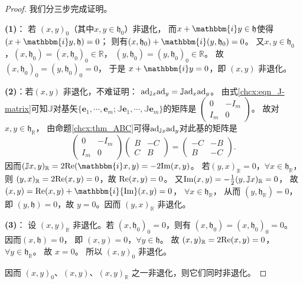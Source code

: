 \begin{proof}
我们分三步完成证明。

{\bfseries (1)}： 若 $(x, y)_0$（其中$x,y\in\mathfrak{h}_0$）非退化，
而$x+\mathbbm{i} y \in \mathfrak{h}$使得$(x+\mathbbm{i} y, \mathfrak{h})=0$；
则有$(x, \mathfrak{h}_0)+\mathbbm{i} (y, \mathfrak{h}_0)=0$。
又$x, y \in \mathfrak{h}_0$，$(x, \mathfrak{h}_0)= (x, \mathfrak{h}_0)_0 \in \mathbb{R}$，
$(y, \mathfrak{h}_0)=(y, \mathfrak{h}_0)_0 \in \mathbb{R}$。 
故$(x, \mathfrak{h}_0)_0=(y, \mathfrak{h}_0)_0=0$，
于是 $x+\mathbbm{i} y=0$，即 $(x, y)$ 非退化。

{\bfseries (2)}：若$(x, y)$ 非退化，不难证明：
${\rm ad}_{ \mathbb{J} x} {\rm ad}_y=\mathbb{J} {\rm ad}_x {\rm ad}_y$。
由式\eqref{chcx:eqn_J-matrix}可知$\mathbb{J}$对基矢$\{\boldsymbol{e}_1,\cdots,\boldsymbol{e}_m;
\mathbb{J}\boldsymbol{e}_1,\cdots,\mathbb{J}\boldsymbol{e}_m\}$的矩阵是
$    \left(\begin{smallmatrix}
    0& -I_m \\ I_m & 0
\end{smallmatrix}\right)$。
故对 $x, y \in \mathfrak{h}_{\mathbb{R}}$，
由命题\ref{chcx:thm_ABC}可得${\rm ad}_{ \mathbb{J} x} {\rm ad}_y$对此基的矩阵是
\begin{equation}
\left(\begin{array}{cc}
    0 & -I_m \\
    I_m & 0
\end{array}\right)\left(\begin{array}{cc}
    B & -C \\
    C & B
\end{array}\right)=\left(\begin{array}{cc}
    -C & -B \\
    B & -C
\end{array}\right) .
\end{equation}
因而$(\mathbb{J} x, y)_{\mathbb{R}}=2 {\rm Re}(\mathbbm{i} x, y)=-2 {\rm Im}(x, y)$。
若$(y, x)_{\mathbb{R}}=0$，$\forall x \in \mathfrak{h}_{\mathbb{R}}$，
则 $(y, x)_{\mathbb{R}}=2 {\rm Re}(x, y)=0$，故 ${\rm Re}(x, y)=0$。
又${\rm Im}(x, y)=-\frac{1}{2}(y, \mathbb{J} x)_{\mathbb{R}}=0$，
故 $(x, y)={\rm Re}(x, y)+ \mathbbm{i} {\rm Im}(x, y)=0$，
$\forall x \in \mathfrak{h}_{\mathbb{R}}$，
从而 $(y , \mathfrak{h}_{\mathbb{R}})=0$， 
即 $(y, \mathfrak{h})=0$，故 $y=0$。因而 $(y, x)_{\mathbb{R}}$ 非退化。

{\bfseries (3)}： 设 $(x, y)_{\mathbb{R}}$ 非退化。若 $(x, \mathfrak{h}_0)_0=0$，则有
$(x, \mathfrak{h}_0)=(x, \mathfrak{h}_0)_0=0 $。
因而$(x, \mathfrak{h})=0$， 即 $(x, y)=0$，$\forall y \in \mathfrak{h}$。
故 $(x, y)_{\mathbb{R}}=2 {\rm Re}(x, y)=0$，
$ \forall y \in \mathfrak{h}_{\mathbb{R}}$。 
故 $x=0$。 所以 $(x, y)_0$ 非退化。

因而 $(x, y)_0$、$(x, y)$、$(x, y)_{\mathbb{R}}$ 之一非退化，则它们同时非退化。
\end{proof}

